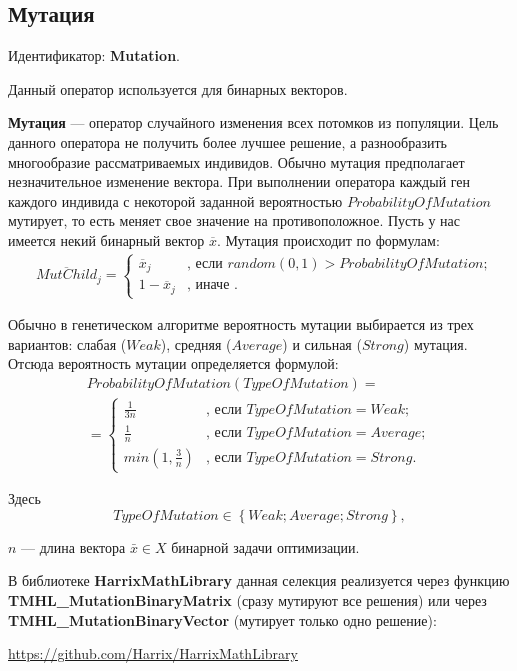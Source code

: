 \subsection{Мутация} \label{SetOfOperatorsAlgorithms:Mutation}

Идентификатор: \textbf{Mutation}.

Данный оператор используется для бинарных векторов.

\textbf{Мутация} --- оператор случайного изменения всех потомков из популяции. Цель данного оператора  не получить более лучшее решение, а разнообразить многообразие рассматриваемых индивидов. Обычно мутация предполагает незначительное изменение вектора. При выполнении оператора каждый ген каждого индивида с некоторой заданной вероятностью  $ ProbabilityOfMutation $ мутирует, то есть меняет свое значение на противоположное. Пусть у нас имеется некий бинарный вектор $ \overline{x} $.  Мутация происходит по формулам:
\begin{align}
\label{SetOfOperatorsAlgorithms:eq:Mutation}
&\overline{MutChild}_j=\left\lbrace \begin{aligned}
\overline{x}_j&\text{, если } random \left(0, 1 \right)>ProbabilityOfMutation; \\
1-\overline{x}_j&\text{, иначе }.
\end{aligned}\right.
\end{align}

Обычно в генетическом алгоритме вероятность мутации выбирается из трех вариантов: слабая ($ Weak $), средняя ($ Average $) и сильная ($ Strong $) мутация.
Отсюда вероятность мутации определяется формулой:
\begin{align}
\label{SetOfOperatorsAlgorithms:eq:ProbabilityOfMutation}
ProbabilityOfMutation\left( TypeOfMutation\right) =\\ =\left\lbrace \begin{aligned}
\frac{1}{3n}&\text{, если }TypeOfMutation=Weak; \\ \frac{1}{n}&\text{, если }TypeOfMutation=Average; \\ min\left(1, \frac{3}{n}\right) &\text{, если }TypeOfMutation=Strong.
\end{aligned}\right.\nonumber
\end{align}

Здесь
\begin{equation}
\label{SetOfOperatorsAlgorithms:eq:TypeOfMutation}
TypeOfMutation \in \left\lbrace Weak; Average;Strong\right\rbrace ,
\end{equation}

$ n $ --- длина вектора $ \bar{x}\in X $ бинарной задачи оптимизации.

В библиотеке \textbf{HarrixMathLibrary} данная селекция реализуется через функцию \textbf{TMHL\_MutationBinaryMatrix} (сразу мутируют все решения) или через \textbf{TMHL\_MutationBinaryVector} (мутирует только одно решение):

\href{https://github.com/Harrix/HarrixMathLibrary}{https://github.com/Harrix/HarrixMathLibrary}